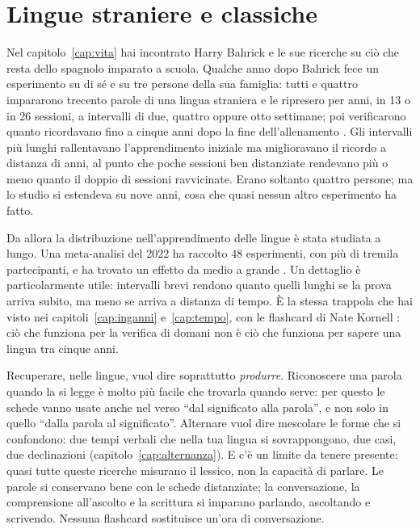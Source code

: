 \section{Lingue straniere e classiche}

Nel capitolo~\ref{cap:vita} hai incontrato Harry Bahrick e le sue
ricerche su ciò che resta dello spagnolo imparato a scuola. Qualche
anno dopo Bahrick fece un esperimento su di sé e su tre persone della
sua famiglia: tutti e quattro impararono
trecento parole di una lingua straniera e le ripresero per anni, in 13
o in 26 sessioni, a intervalli di due, quattro oppure otto settimane;
poi verificarono quanto ricordavano fino a cinque anni dopo la fine
dell'allenamento \parencite{bahrick1993}. Gli intervalli più lunghi
rallentavano l'apprendimento iniziale ma miglioravano il ricordo
a distanza di anni, al punto che poche sessioni ben distanziate
rendevano più o meno quanto il doppio di sessioni ravvicinate. Erano
soltanto quattro persone; ma lo studio si estendeva su nove anni, cosa che quasi nessun altro
esperimento ha fatto.

Da allora la distribuzione nell'apprendimento delle lingue è stata
studiata a lungo. Una meta-analisi del 2022 ha raccolto 48 esperimenti,
con più di tremila partecipanti, e ha trovato un effetto da medio a
grande \parencite{kim2022}. Un dettaglio è particolarmente utile:
intervalli brevi rendono quanto quelli lunghi se la prova arriva
subito, ma meno se arriva a distanza di tempo. È la stessa trappola
che hai visto nei capitoli~\ref{cap:inganni} e~\ref{cap:tempo}, con le
flashcard di Nate Kornell \parencite{kornell2009}: ciò che funziona per
la verifica di domani non è ciò che funziona per sapere una lingua tra
cinque anni.

Recuperare, nelle lingue, vuol dire soprattutto \emph{produrre}.
Riconoscere una parola quando la si legge è molto più facile che
trovarla quando serve: per questo le schede vanno usate anche nel verso
\enquote{dal significato alla parola}, e non solo in quello
\enquote{dalla parola al significato}. Alternare vuol dire mescolare le
forme che si confondono: due tempi verbali che nella tua lingua si
sovrappongono, due casi, due declinazioni (capitolo~\ref{cap:alternanza}).
E c'è un limite da tenere presente: quasi tutte queste ricerche
misurano il lessico, non la capacità di parlare. Le parole si
conservano bene con le schede distanziate; la conversazione, la
comprensione all'ascolto e la scrittura si imparano parlando,
ascoltando e scrivendo. Nessuna flashcard sostituisce un'ora di
conversazione.


